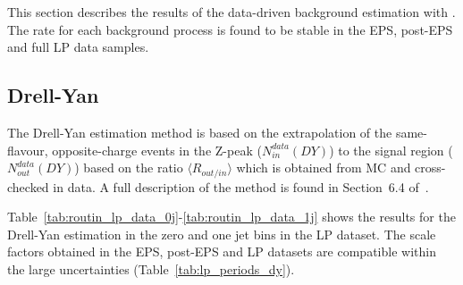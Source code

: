 This section describes the results of the data-driven background estimation with \lpintlumi. 
The rate for each background process is found to be stable in the EPS, post-EPS and full LP data samples.

\subsection{Drell-Yan}

The Drell-Yan estimation method is based on the extrapolation of the same-flavour, opposite-charge events in the Z-peak ($N_{in}^{data}(DY)$) 
to the signal region ($N_{out}^{data}(DY)$) based on the ratio $\langle R_{out/in} \rangle$ which is obtained from MC and cross-checked in data.
A full description of the method is found in Section~6.4 of~\cite{epsnote}.

Table~\ref{tab:routin_lp_data_0j}-\ref{tab:routin_lp_data_1j} 
shows the results for the Drell-Yan estimation in the zero and one jet bins in the LP dataset. 
The scale factors obtained in the EPS, post-EPS and LP datasets are compatible within the large uncertainties (Table~\ref{tab:lp_periods_dy}).

